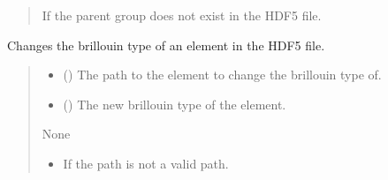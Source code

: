 \documentclass[letterpaper,10pt,english]{sphinxmanual}
\begin{document}
\begin{fulllineitems}
\begin{fulllineitems}
\begin{quote}
\begin{description}
\begin{itemize}
\end{itemize}

\sphinxAtStartPar
{\hyperref[\detokenize{source/HDF5_BLS:HDF5_BLS.WrapperError.WrapperError_StructureError}]{}} \textendash{} If the parent group does not exist in the HDF5 file.

\end{description}\end{quote}

\end{fulllineitems}


\begin{fulllineitems}
\label{\detokenize{source/HDF5_BLS:HDF5_BLS.wrapper.Wrapper.change_brillouin_type}}
\pysigstartsignatures
\pysiglinewithargsret
{}
{\sphinxparamcomma {}}
{}
\pysigstopsignatures
\sphinxAtStartPar
Changes the brillouin type of an element in the HDF5 file.
\begin{quote}\begin{description}
\begin{itemize}
\item {} 
\sphinxAtStartPar
{} () \textendash{} The path to the element to change the brillouin type of.

\item {} 
\sphinxAtStartPar
{} () \textendash{} The new brillouin type of the element.

\end{itemize}

\sphinxAtStartPar
None

\begin{itemize}
\item {} 
\sphinxAtStartPar
{\hyperref[\detokenize{source/HDF5_BLS:HDF5_BLS.WrapperError.WrapperError_StructureError}]{}} \textendash{} If the path is not a valid path.


\end{itemize}
\end{description}
\end{quote}
\end{fulllineitems}
\end{fulllineitems}
\end{document}
